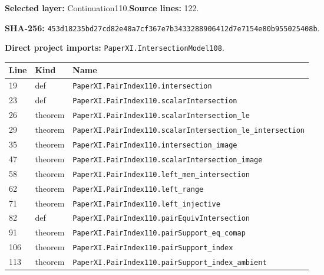 \documentclass[10pt,oneside]{book}
\begin{document}
\textbf{Selected layer:} Continuation110.\quad\textbf{Source lines:} 122.\par\textbf{SHA-256:} {\scriptsize\nolinkurl{453d18235bd27cd82e48a7cf367e7b3433288906412d7e7154e80b955025408b}}.


\textbf{Direct project imports:} \nolinkurl{PaperXI.IntersectionModel108}.

\begin{longtable}{@{}p{}p{}p{}@{}}\toprule Line&Kind&Name\\\midrule\endhead

19&def&\nolinkurl{PaperXI.PairIndex110.intersection}\\

23&def&\nolinkurl{PaperXI.PairIndex110.scalarIntersection}\\

26&theorem&\nolinkurl{PaperXI.PairIndex110.scalarIntersection_le}\\

29&theorem&\nolinkurl{PaperXI.PairIndex110.scalarIntersection_le_intersection}\\

35&theorem&\nolinkurl{PaperXI.PairIndex110.intersection_image}\\

47&theorem&\nolinkurl{PaperXI.PairIndex110.scalarIntersection_image}\\

58&theorem&\nolinkurl{PaperXI.PairIndex110.left_mem_intersection}\\

62&theorem&\nolinkurl{PaperXI.PairIndex110.left_range}\\

71&theorem&\nolinkurl{PaperXI.PairIndex110.left_injective}\\

82&def&\nolinkurl{PaperXI.PairIndex110.pairEquivIntersection}\\

91&theorem&\nolinkurl{PaperXI.PairIndex110.pairSupport_eq_comap}\\

106&theorem&\nolinkurl{PaperXI.PairIndex110.pairSupport_index}\\

113&theorem&\nolinkurl{PaperXI.PairIndex110.pairSupport_index_ambient}\\

\bottomrule\end{longtable}
\end{document}
